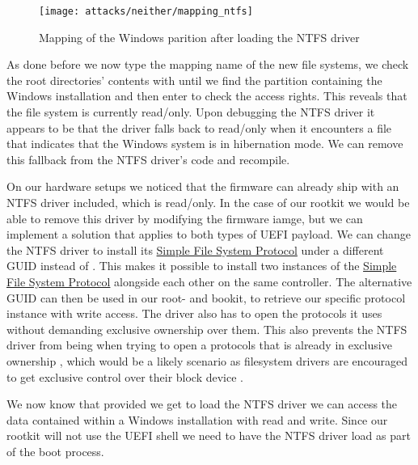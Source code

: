 \begin{figure}[htb]
    \centering
    \texttt{[image: attacks/neither/mapping\_ntfs]}
    \caption{Mapping of the Windows parition after loading the \ac{NTFS} driver}
    \label{fig:mapping-ntfs}
\end{figure}

As done before we now type the mapping name of the new file systems, we check the root directories' contents with  until we find the partition containing the Windows installation and then enter  to check the access rights.
This reveals that the file system is currently read\-/only.
Upon debugging the \ac{NTFS} driver it appears to be that the driver falls back to read\-/only when it encounters a file that indicates that the Windows system is in hibernation mode.
We can remove this fallback from the \ac{NTFS} driver's code and recompile.

On our hardware setups we noticed that the firmware can already ship with an \ac{NTFS} driver included, which is read\-/only.
In the case of our rootkit we would be able to remove this driver by modifying the firmware iamge, but we can implement a solution that applies to both types of \ac{UEFI} payload.
We can change the \ac{NTFS} driver to install its \hyperref[lst:simple-file-system-protocol]{Simple File System Protocol} under a different \ac{GUID} instead of .
This makes it possible to install two instances of the \hyperref[lst:simple-file-system-protocol]{Simple File System Protocol} alongside each other on the same controller.
The alternative \ac{GUID} can then be used in our root- and bookit, to retrieve our specific protocol instance with write access.
The driver also has to open the protocols it uses without demanding exclusive ownership over them.
This also prevents the \ac{NTFS} driver from being when trying to open a protocols that is already in exclusive ownership \cite[Section 7.3]{uefi-spec}, which would be a likely scenario as filesystem drivers are encouraged to get exclusive control over their block device \cite[Section 13.5]{uefi-spec}.

We now know that provided we get to load the \ac{NTFS} driver we can access the data contained within a Windows installation with read and write.
 Since our rootkit will not use the UEFI shell we need to have the \ac{NTFS} driver load as part of the boot process.

